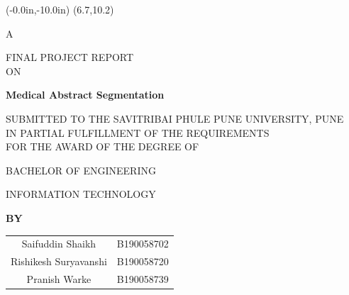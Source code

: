 \documentclass[12pt,a4paper]{report}     %
\begin{document}
\newpage
\pagestyle{plain}
\pagestyle{empty}
\pagestyle{fancy}							%
\renewcommand{\headrulewidth}{0pt}


	\thisfancyput(-0.0in,-10.0in){%
\setlength{\unitlength}{1in}\framebox(6.7,10.2)}
\begin{center}
      
      \begin{center} {A} \end{center}
      \vspace{0.2 in}
      { FINAL PROJECT REPORT}
      \vspace{0.2 in}\\
       ON
			\end{center}
	\begin{center}
	    \vspace{0.1 in}
		\textbf{\large  Medical Abstract Segmentation  } %
		\vspace{0.2 in}
	\end{center}
     \vspace{0.2 in}
		\begin{center}
	    SUBMITTED TO THE SAVITRIBAI PHULE PUNE UNIVERSITY, PUNE \\
	    IN PARTIAL FULFILLMENT OF THE REQUIREMENTS\\
	    FOR THE AWARD OF THE DEGREE OF
	\end{center}
	\vspace{0.1 in}
	
	\begin{center}
	   {BACHELOR OF ENGINEERING}\\
	    \begin{small}{ INFORMATION TECHNOLOGY}
\end{small}	\end{center}
	\vspace{0.1 in}
	
	\begin{center}
	   \textbf{BY}
	\end{center}
	\vspace{0.1 in}
	
	\begin{center}
\begin{tabular}{ c c }
    
    Saifuddin Shaikh &  B190058702 \\
    Rishikesh Suryavanshi & B190058720 \\
    Pranish Warke & B190058739 \\
\end{tabular}
 
	\end{center}
	\vspace{0.1 in}
	
\end{document}
